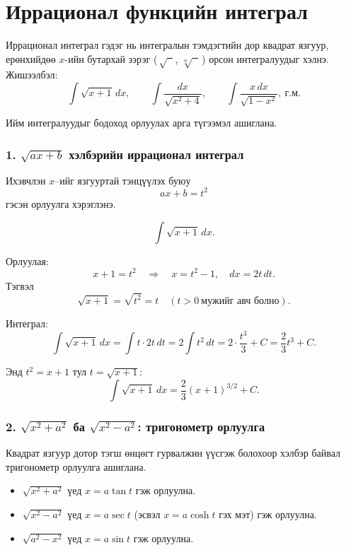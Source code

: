 \section{Иррационал функцийн интеграл}

Иррационал интеграл гэдэг нь интегралын тэмдэгтийн дор квадрат язгуур, ерөнхийдөө $x$-ийн бутархай зэрэг (\,$\sqrt{\phantom{x}}$, $\sqrt[n]{\phantom{x}}$\,) орсон интегралуудыг хэлнэ. Жишээлбэл:
\[
\int \sqrt{x+1}\,dx,\qquad 
\int \frac{dx}{\sqrt{x^2+4}},\qquad
\int \frac{x\,dx}{\sqrt{1-x^2}},\ \text{г.м.}
\]

Ийм интегралуудыг бодоход орлуулах арга түгээмэл ашиглана.

\subsubsection*{1. $\sqrt{ax+b}$ хэлбэрийн иррационал интеграл}

Ихэвчлэн $x$–ийг язгууртай тэнцүүлэх буюу
\[
 ax+b=t^2
\]
гэсэн орлуулга хэрэглэнэ.

\begin{example}
\[
\int \sqrt{x+1}\,dx.
\]

Орлуулая:
\[
x+1 = t^2 \quad\Rightarrow\quad x = t^2-1,\quad dx = 2t\,dt.
\]
Тэгвэл
\[
\sqrt{x+1} = \sqrt{t^2} = t \quad (t>0\ \text{мужийг авч болно}).
\]

Интеграл:
\[
\int \sqrt{x+1}\,dx
= \int t \cdot 2t\,dt
= 2\int t^2\,dt
= 2\cdot \frac{t^3}{3} + C
= \frac{2}{3}t^3 + C.
\]

Энд $t^2 = x+1$ тул $t=\sqrt{x+1}$:
\[
\int \sqrt{x+1}\,dx 
= \frac{2}{3}(x+1)^{3/2} + C.
\]
\end{example}

\subsubsection*{2. $\sqrt{x^2+a^2}$ ба $\sqrt{x^2-a^2}$: тригонометр орлуулга}

Квадрат язгуур дотор тэгш өнцөгт гурвалжин үүсгэж болохоор хэлбэр байвал тригонометр орлуулга ашиглана.

\begin{itemize}
  \item $\sqrt{x^2+a^2}$ үед $x = a\tan t$ гэж орлуулна.
  \item $\sqrt{x^2-a^2}$ үед $x = a\sec t$ (эсвэл $x=a\cosh t$ гэх мэт) гэж орлуулна.
  \item $\sqrt{a^2-x^2}$ үед $x = a\sin t$ гэж орлуулна.
\end{itemize}

